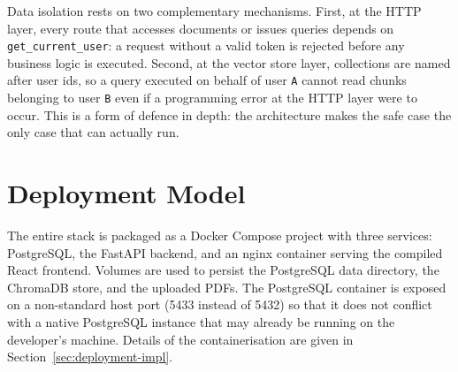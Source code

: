 Data isolation rests on two complementary mechanisms. First, at the HTTP
layer, every route that accesses documents or issues queries depends on
\texttt{get\_current\_user}: a request without a valid token is rejected
before any business logic is executed. Second, at the vector store
layer, collections are named after user ids, so a query executed on
behalf of user \texttt{A} cannot read chunks belonging to user \texttt{B}
even if a programming error at the HTTP layer were to occur. This is a
form of defence in depth: the architecture makes the safe case the
only case that can actually run.

\section{Deployment Model}
\label{sec:deployment-model}

The entire stack is packaged as a Docker Compose project with three
services: PostgreSQL, the FastAPI backend, and an nginx container serving
the compiled React frontend. Volumes are used to persist the PostgreSQL
data directory, the ChromaDB store, and the uploaded PDFs. The PostgreSQL
container is exposed on a non-standard host port (5433 instead of 5432)
so that it does not conflict with a native PostgreSQL instance that may
already be running on the developer's machine. Details of the
containerisation are given in Section~\ref{sec:deployment-impl}.
